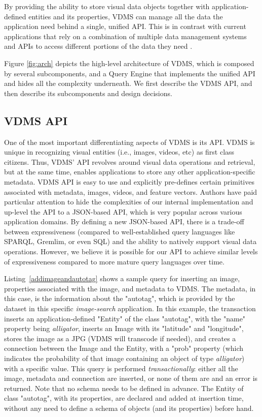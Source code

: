 By providing the ability to store visual data objects together with
application-defined entities and its properties, VDMS can manage
all the data the application need behind a single, unified API.
This is in contrast with current applications that rely on a combination
of multiple data management systems and APIs to access different
portions of the data they need
\cite{tao, sculley2015hidden, mayer2020scalable, sculley2015hidden}.

Figure \ref{fig:arch} depicts the high-level architecture of VDMS, which
is composed by several subcomponents, and a Query Engine that implements
the unified API and hides all the complexity underneath.
We first describe the VDMS API, and then describe its subcomponents
and design decisions.

\subsection{VDMS API}

One of the most important differentiating aspects of VDMS is its API.
VDMS is unique in recognizing visual entities (i.e., images, videos, etc)
as first class citizens.
Thus, VDMS' API revolves around visual data operations and retrieval,
but at the same time, enables applications to store any other
application-specific metadata.
VDMS API is easy to use and explicitly pre-defines certain
primitives associated with metadata, images, videos, and feature vectors.
Authors have paid particular attention to hide the complexities of our internal
implementation and up-level the API to a JSON-based API,
which is very popular across various application domains.
By defining a new JSON-based API, there is a trade-off between expressiveness
(compared to well-established query languages like SPARQL, Gremlim, or even SQL)
and the ability to natively support visual data operations.
However, we believe it is possible for our API to achieve similar levels of
expressiveness compared to more mature query languages over time.

Listing~\ref{addimageandautotag} shows a sample query for inserting
an image, properties associated with the image, and metadata to VDMS.
The metadata, in this case, is the information about the "autotag",
which is provided by the dataset in this specific
\textit{image-search} application.
In this example, the transaction inserts an application-defined "Entity" of
the class "autotag", with the "name" property being \textit{alligator},
inserts an Image with its "latitude" and "longitude",
stores the image as a JPG (VDMS will transcode if needed),
and creates a connection between the Image and the Entity, with a "prob"
property (which indicates the probability of that image
containing an object of type  \textit{alligator}) with a specific value.
This query is performed \textit{transactionally}: either all the image, metadata
and connection are inserted, or none of them are and an error is returned.
Note that no schema needs to be defined in advance.
The Entity of class "autotag", with its properties, are declared and added
at insertion time, without any need to define a schema of objects
(and its properties) before hand.

